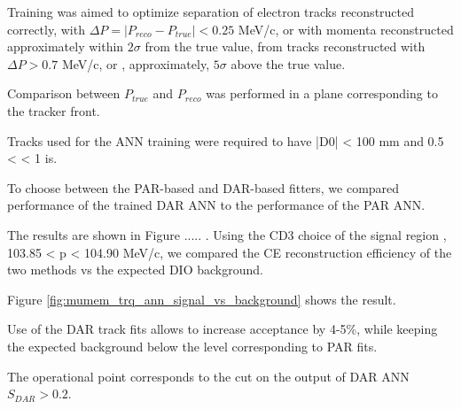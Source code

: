 Training was aimed to optimize separation of electron tracks reconstructed correctly, 
with $\Delta{P} = |P_{reco}-P_{true}| < 0.25$ MeV/c, or with momenta reconstructed approximately
within $2\sigma$ from the true value, from tracks reconstructed
with $\Delta{P} > 0.7$ MeV/c, or , approximately, $5\sigma$ above the true value.

Comparison between $P_{true}$ and $P_{reco}$ was performed in a  plane corresponding to the tracker front.

Tracks used for the ANN training were required to have |D0| < 100 mm and 0.5 < \tandip < 1 is. 

To choose between the PAR-based and DAR-based fitters, we compared performance of the
trained DAR ANN to the performance of the PAR ANN.

The results are shown in Figure ..... .
Using the CD3 choice of the signal region , 103.85 < p < 104.90 MeV/c, we compared the
CE reconstruction efficiency of the two methods vs the expected DIO background.

Figure \ref{fig:mumem_trq_ann_signal_vs_background} shows the result.

Use of the DAR track fits allows to increase acceptance by 4-5\%, while keeping the expected
background below the level corresponding to PAR fits.

The operational point corresponds to the cut on the output of DAR ANN $S_{DAR} > 0.2$.

